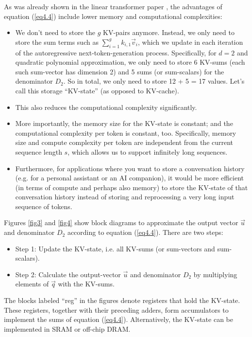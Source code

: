 \documentclass{article}
\numberwithin{equation}{section} %
\def\q{\vec{q}}
\def\v{\vec{v}}
\def\u{\vec{u}}
\begin{document}
As was already shown in the linear transformer paper \citep{linear}, the advantages of equation (\ref{eq4.4}) include lower memory and computational complexities:
\begin{itemize}[topsep=-1pt, itemsep=-1pt]
  \item We don’t need to store the $g$ KV-pairs anymore. Instead, we only need to store the sum terms such as $\sum_{i=1}^g k_{i,1} \v_i$, which we update in each iteration of the autoregressive next-token-generation process. Specifically, for $d = 2$ and quadratic polynomial approximation, we only need to store 6 KV-sums (each such sum-vector has dimension 2) and 5 sums (or sum-scalars) for the denominator $D_2$. So in total, we only need to store 12 + 5 = 17 values. Let’s call this storage “KV-state” (as opposed to KV-cache).
  \item This also reduces the computational complexity significantly.
  \item More importantly, the memory size for the KV-state is constant; and the computational complexity per token is constant, too. Specifically, memory size and compute complexity per token are independent from the current sequence length $s$, which allows us to support infinitely long sequences.
  \item Furthermore, for applications where you want to store a conversation history (e.g. for a personal assistant or an AI companion), it would be more efficient (in terms of compute and perhaps also memory) to store the KV-state of that conversation history instead of storing and reprocessing a very long input sequence of tokens.
\end{itemize}

Figures \ref{fig3} and \ref{fig4} show block diagrams to approximate the output vector $\u$ and denominator $D_2$ according to equation (\ref{eq4.4}). There are two steps:
\begin{itemize}[topsep=-1pt, itemsep=-1pt]
  \item Step 1: Update the KV-state, i.e. all KV-sums (or sum-vectors and sum-scalars).
  \item Step 2: Calculate the output-vector $\u$ and denominator $D_2$ by multiplying elements of $\q$ with the KV-sums.
\end{itemize}

The blocks labeled “reg” in the figures denote registers that hold the KV-state. These registers, together with their preceding adders, form accumulators to implement the sums of equation (\ref{eq4.4}). Alternatively, the KV-state can be implemented in SRAM or off-chip DRAM.
\end{document}
